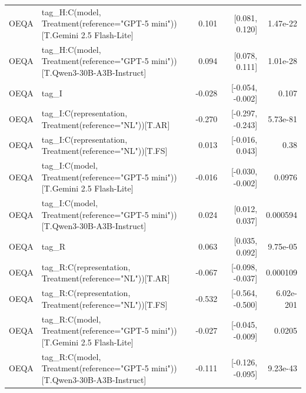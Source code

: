 \begin{tabular}{llrrr}
OEQA & tag\_H:C(model, Treatment(reference="GPT-5 mini"))[T.Gemini 2.5 Flash-Lite] & 0.101 & [0.081, 0.120] & 1.47e-22 \\
OEQA & tag\_H:C(model, Treatment(reference="GPT-5 mini"))[T.Qwen3-30B-A3B-Instruct] & 0.094 & [0.078, 0.111] & 1.01e-28 \\
OEQA & tag\_I & -0.028 & [-0.054, -0.002] & 0.107 \\
OEQA & tag\_I:C(representation, Treatment(reference="NL"))[T.AR] & -0.270 & [-0.297, -0.243] & 5.73e-81 \\
OEQA & tag\_I:C(representation, Treatment(reference="NL"))[T.FS] & 0.013 & [-0.016, 0.043] & 0.38 \\
OEQA & tag\_I:C(model, Treatment(reference="GPT-5 mini"))[T.Gemini 2.5 Flash-Lite] & -0.016 & [-0.030, -0.002] & 0.0976 \\
OEQA & tag\_I:C(model, Treatment(reference="GPT-5 mini"))[T.Qwen3-30B-A3B-Instruct] & 0.024 & [0.012, 0.037] & 0.000594 \\
OEQA & tag\_R & 0.063 & [0.035, 0.092] & 9.75e-05 \\
OEQA & tag\_R:C(representation, Treatment(reference="NL"))[T.AR] & -0.067 & [-0.098, -0.037] & 0.000109 \\
OEQA & tag\_R:C(representation, Treatment(reference="NL"))[T.FS] & -0.532 & [-0.564, -0.500] & 6.02e-201 \\
OEQA & tag\_R:C(model, Treatment(reference="GPT-5 mini"))[T.Gemini 2.5 Flash-Lite] & -0.027 & [-0.045, -0.009] & 0.0205 \\
OEQA & tag\_R:C(model, Treatment(reference="GPT-5 mini"))[T.Qwen3-30B-A3B-Instruct] & -0.111 & [-0.126, -0.095] & 9.23e-43 \\
\bottomrule
\end{tabular}

